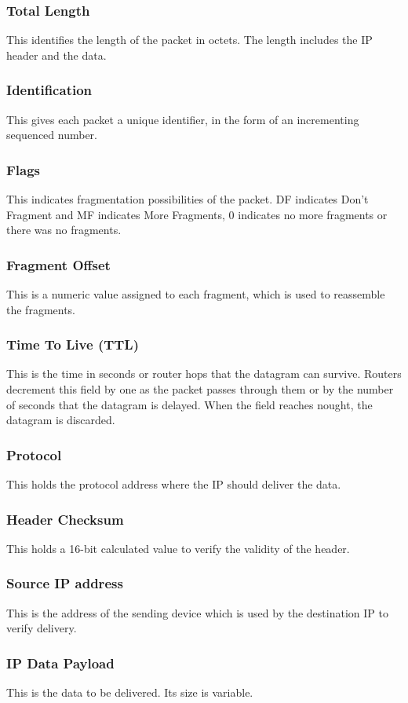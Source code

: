 \subsubsection*{Total Length}
This identifies the length of the packet in octets. The length includes the IP header and the data.
\subsubsection*{Identification}
This gives each packet a unique identifier, in the form of an incrementing sequenced number.
\subsubsection*{Flags}
This indicates fragmentation possibilities of the packet. DF indicates Don't Fragment and MF indicates More Fragments, 0 indicates no more fragments or there was no fragments.
\subsubsection*{Fragment Offset}
This is a numeric value assigned to each fragment, which is used to reassemble the fragments.
\subsubsection*{Time To Live (TTL)}
This is the time in seconds or router hops that the datagram can survive. Routers decrement this field by one as the packet passes through them or by the number of seconds that the datagram is delayed. When the field reaches nought, the datagram is discarded.
\subsubsection*{Protocol}
This holds the protocol address where the IP should deliver the data.
\subsubsection*{Header Checksum}
This holds a 16-bit calculated value to verify the validity of the header.
\subsubsection*{Source IP address}
This is the address of the sending device which is used by the destination IP to verify delivery.
\subsubsection*{IP Data Payload}
This is the data to be delivered. Its size is variable.

